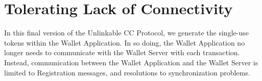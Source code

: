 \section{Tolerating Lack of Connectivity}
\label{unlinkable-design-3}

In this final version of the Unlinkable CC Protocol, we generate the single-use tokens within the Wallet Application.
In so doing, the Wallet Application no longer needs to communicate with the Wallet Server with each transaction.
Instead, communication between the Wallet Application and the Wallet Server is limited to Registration messages, and resolutions to synchronization problems.